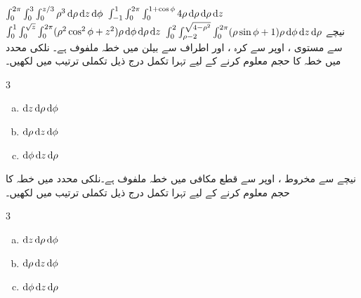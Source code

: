 $\int_{0}^{2\pi}\int_{0}^{3}\int_{0}^{z/3} \rho^3\dif\rho \dif z\dif \phi$
$\int_{-1}^{1}\int_{0}^{2\pi}\int_{0}^{1+\cos\phi} 4\rho\dif\rho \dif \rho\dif z$
$\int_{0}^{1}\int_{0}^{\sqrt{z}}\int_{0}^{2\pi}(\rho^2\cos^2\phi+z^2)\rho \dif\phi\dif\rho \dif z$
$\int_{0}^{2}\int_{\rho-2}^{\sqrt{4-\rho^2}}\int_{0}^{2\pi} (\rho\sin\phi+1)\rho \dif \phi \dif z\dif \rho$
نیچے سے مستوی ، اوپر سے کرہ ، اور اطراف سے بیلن  میں  خطہ   ملفوف ہے۔ نلکی محدد میں  خطہ  کا حجم معلوم کرنے کے لیے تہرا تکمل درج ذیل  تکملی  ترتیب  میں لکھیں۔
\begin{multicols}{3}
\begin{enumerate}[a.]
\item
$\dif z\dif \rho\dif\phi$
\item
$\dif \rho\dif z\dif\phi$
\item
$\dif \phi\dif z\dif\rho$
\end{enumerate}
\end{multicols}
نیچے سے مخروط  ، اوپر سے قطع مکافی    میں  خطہ   ملفوف ہے۔نلکی محدد میں  خطہ  کا حجم معلوم کرنے کے لیے تہرا تکمل درج ذیل  تکملی ترتیب میں لکھیں۔
\begin{multicols}{3}
\begin{enumerate}[a.]
\item
$\dif z\dif \rho\dif\phi$
\item
$\dif \rho\dif z\dif\phi$
\item
$\dif \phi\dif z\dif\rho$
\end{enumerate}
\end{multicols}
